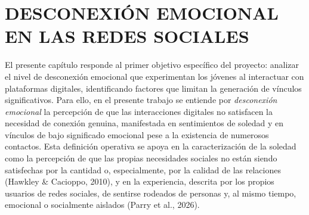 \chapter{DESCONEXIÓN EMOCIONAL EN LAS REDES SOCIALES}
El presente capítulo responde al primer objetivo específico del proyecto: analizar el nivel de desconexión emocional que experimentan los jóvenes al interactuar con plataformas digitales, identificando factores que limitan la generación de vínculos significativos. Para ello, en el presente trabajo se entiende por \textit{desconexión emocional} la percepción de que las interacciones digitales no satisfacen la necesidad de conexión genuina, manifestada en sentimientos de soledad y en vínculos de bajo significado emocional pese a la existencia de numerosos contactos. Esta definición operativa se apoya en la caracterización de la soledad como la percepción de que las propias necesidades sociales no están siendo satisfechas por la cantidad o, especialmente, por la calidad de las relaciones (Hawkley \& Cacioppo, 2010), y en la experiencia, descrita por los propios usuarios de redes sociales, de sentirse rodeados de personas y, al mismo tiempo, emocional o socialmente aislados (Parry et al., 2026).

